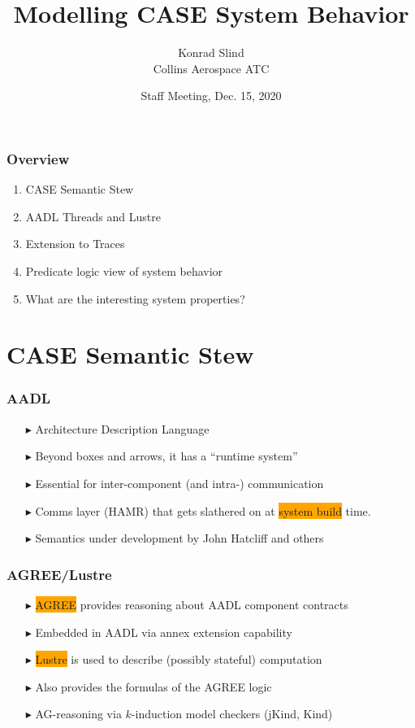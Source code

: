 \documentclass{beamer}
\newcommand{\kemph}[1]{\colorbox{orange}{#1}}
\begin{document}

\author{Konrad Slind \\ Collins Aerospace ATC}
\date{Staff Meeting, Dec. 15, 2020}
\title{Modelling CASE System Behavior}
\maketitle

\begin{frame}\frametitle{Overview}

\begin{enumerate}
\item CASE Semantic Stew
\item AADL Threads and Lustre
\item Extension to Traces
\item Predicate logic view of system behavior
\item What are the interesting system properties?
\end{enumerate}
\end{frame}


\section {CASE Semantic Stew}

\begin{frame}\frametitle{AADL}
\begin{itemize}
\item [$\blacktriangleright$] Architecture Description Language
\item [$\blacktriangleright$] Beyond boxes and arrows, it has a ``runtime system''
\item [$\blacktriangleright$] Essential for inter-component (and intra-) communication
\item [$\blacktriangleright$] Comms layer  (HAMR) that gets slathered on at \kemph{system build} time.
\item [$\blacktriangleright$] Semantics under development by John Hatcliff and others
\end{itemize}

\end{frame}

\begin{frame}\frametitle{AGREE/Lustre}
\begin{itemize}
\item [$\blacktriangleright$] \kemph{AGREE} provides reasoning about AADL component contracts
\item [$\blacktriangleright$] Embedded in AADL via annex extension capability
\item [$\blacktriangleright$] \kemph{Lustre} is used to describe (possibly stateful) computation
\item [$\blacktriangleright$] Also provides the formulas of the AGREE logic
\item [$\blacktriangleright$] AG-reasoning via $k$-induction model checkers (jKind, Kind)
\end{itemize}
\end{frame}
\end{document}
